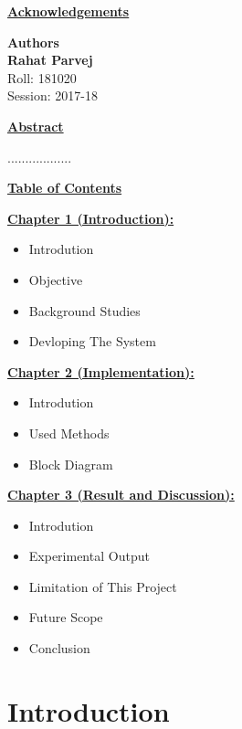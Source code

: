 \documentclass[12pt,a4paper]{report}
\begin{document}
\begin{center}
	\LARGE{\textbf{{\underline{\color{blue}Acknowledgements}}}}\\
\end{center}
\vspace{15cm}
\Large{\textbf{Authors}}\vspace{1cm}\\
\large \textbf{Rahat Parvej}\\
Roll: 181020\\
Session: 2017-18\vspace{1cm}\\
\newpage
\begin{center}
	\Large{\textbf{\underline{\color{blue}Abstract}}}
\end{center}
..................
\newpage
\begin{center}
	\textbf{\LARGE{\underline{\color{blue}Table of Contents}}}
\end{center}
\vspace{2cm}
\textbf{\underline{\color{blue}Chapter 1 (Introduction):}}\\
\begin{itemize}
	\item Introdution
	\item Objective
	\item Background Studies
	\item Devloping The System
\end{itemize}\vspace{1cm}
\textbf{\underline{\color{blue}Chapter 2 (Implementation):}}\\
\begin{itemize}
	\item Introdution
	\item Used Methods
	\item Block Diagram
\end{itemize}\vspace{1cm}
\textbf{\underline{\color{blue} Chapter 3 (Result and Discussion):}}\\
\begin{itemize}
	\item Introdution
	\item Experimental Output
	\item Limitation of This Project
	\item Future Scope
	\item Conclusion
\end{itemize}
	{\color{blue}\chapter{Introduction}}
\end{document}

